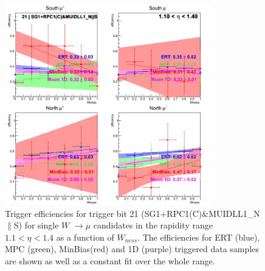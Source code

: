 \begin{figure}[h!]

  \centering

  \includegraphics[width=0.8\textwidth]{./figures/run13_trigeffisn_eta0_trig21_lin.png}
  \caption{\label{fig:run13_trigeffisn_eta0_nper0_trig21_lin} Trigger efficiencies for trigger bit 21 (SG1+RPC1(C)\&MUIDLL1\_N$\|$S) for single $W$ $\rightarrow \mu$ candidates in the rapidity range $ 1.1 < \eta < 1.4$ as a function of $W_{ness}$. The efficiencies for ERT (blue), MPC (green), MinBias(red) and 1D (purple) triggered data samples are shown as well as a constant fit over the whole range.}

\end{figure}
\clearpage
